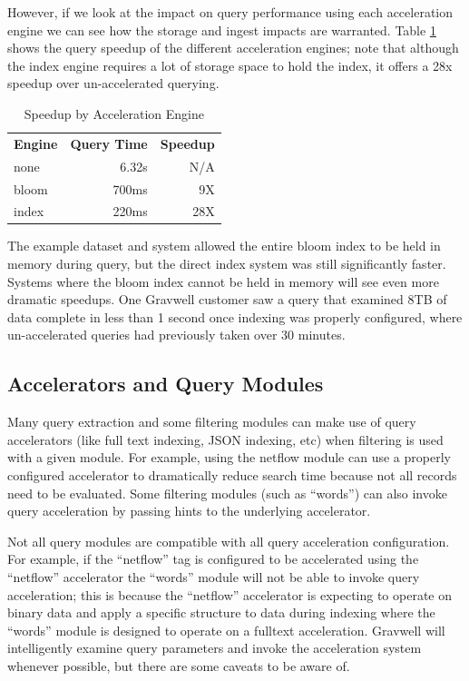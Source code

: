 {However, if we look at the impact on query performance using each
acceleration engine we can see how the storage and ingest impacts are
warranted. Table \ref{table:accel-speedup} shows the query speedup of
the different acceleration engines; note that although the index engine
requires a lot of storage space to hold the index, it offers a 28x speedup
over un-accelerated querying.

\begin{table}
\begin{tabular}{lrr}
	\hline
	\textbf{Engine} & \textbf{Query Time} & \textbf{Speedup} \\
	none & 6.32s & N/A \\
	bloom & 700ms & 9X \\
	index & 220ms & 28X \\
	\hline
\end{tabular}
\caption{Speedup by Acceleration Engine}
\label{table:accel-speedup}
\end{table}

The example dataset and system allowed the entire bloom index to be
held in memory during query, but the direct index system was still
significantly faster. Systems where the bloom index cannot be held in
memory will see even more dramatic speedups. One Gravwell customer saw
a query that examined 8TB of data complete in
less than 1 second once indexing was properly configured, where un-accelerated queries
had previously taken over 30 minutes.

\subsection{Accelerators and Query Modules}

Many query extraction and some filtering modules can make use of query accelerators (like full text indexing, JSON indexing, etc) when filtering is used with a given module. For example, using the netflow module  can use a properly configured accelerator to dramatically reduce search time because not all records need to be evaluated.  Some filtering modules (such as ``words'') can also invoke query acceleration by passing hints to the underlying accelerator.

Not all query modules are compatible with all query acceleration configuration.  For example, if the ``netflow'' tag is configured to be accelerated using the ``netflow'' accelerator the ``words'' module will not be able to invoke query acceleration; this is because the ``netflow'' accelerator is expecting to operate on binary data and apply a specific structure to data during indexing where the ``words'' module is designed to operate on a fulltext acceleration.  Gravwell will intelligently examine query parameters and invoke the acceleration system whenever possible, but there are some caveats to be aware of.

}
